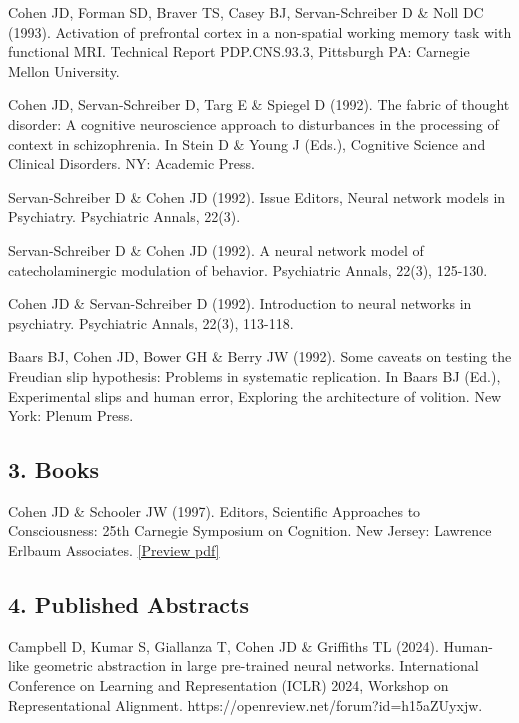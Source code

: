 \documentclass[10 pt]{article}
\begin{document}
Cohen JD, Forman SD, Braver TS, Casey BJ, Servan-Schreiber D \& Noll DC (1993). Activation of prefrontal cortex in a non-spatial working memory task with functional MRI. Technical Report PDP.CNS.93.3, Pittsburgh PA: Carnegie Mellon University.

Cohen JD, Servan-Schreiber D, Targ E \& Spiegel D (1992). The fabric of thought disorder: A cognitive neuroscience approach to disturbances in the processing of context in schizophrenia. In Stein D \& Young J (Eds.), Cognitive Science and Clinical Disorders. NY: Academic Press.

Servan-Schreiber D \& Cohen JD (1992). Issue Editors, Neural network models in Psychiatry. Psychiatric Annals, 22(3).

Servan-Schreiber D \& Cohen JD (1992). A neural network model of catecholaminergic modulation of behavior. Psychiatric Annals, 22(3), 125-130.

Cohen JD \& Servan-Schreiber D (1992). Introduction to neural networks in psychiatry. Psychiatric Annals, 22(3), 113-118.

Baars BJ, Cohen JD, Bower GH \& Berry JW (1992). Some caveats on testing the Freudian slip hypothesis: Problems in systematic replication. In Baars BJ (Ed.), Experimental slips and human error, Exploring the architecture of volition. New York: Plenum Press.
    \smallskip


\subsection*{3. Books} \label{secPUBLICATIONS3}

Cohen JD \& Schooler JW (1997). Editors, Scientific Approaches to Consciousness: 25th Carnegie Symposium on Cognition. New Jersey: Lawrence Erlbaum Associates. \href{https://www.taylorfrancis.com/books/edit/10.4324/9781315806563/scientific-approaches-consciousness-jonathan-cohen-jonathan-schooler}{[Preview pdf]}
    \smallskip


\subsection*{4. Published Abstracts } \label{secPUBLICATIONS4}

Campbell D, Kumar S, Giallanza T, Cohen JD \& Griffiths TL (2024). Human-like geometric abstraction in large pre-trained neural networks. International Conference on Learning and Representation (ICLR) 2024, Workshop on Representational Alignment. https://openreview.net/forum?id=h15aZUyxjw.
\end{document}

